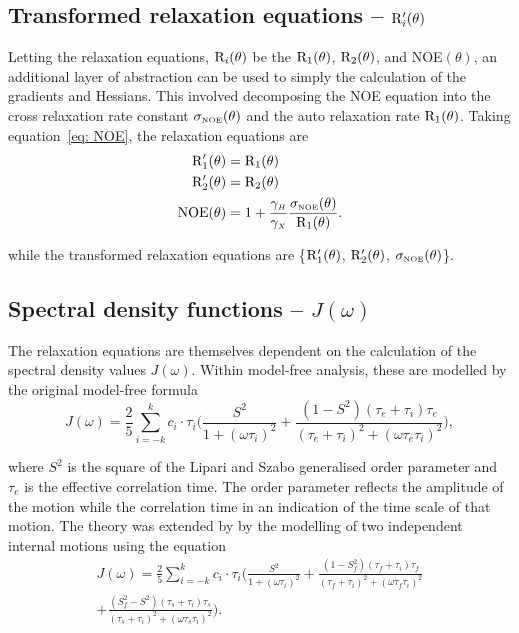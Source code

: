 \subsection{Transformed relaxation equations -- $\mathrm{R}_i'(\theta)$}

Letting the relaxation equations, $\mathrm{R}_i(\theta)$ be the $\mathrm{R}_1(\theta)$, $\mathrm{R}_2(\theta)$, and NOE$(\theta)$, an additional layer of abstraction can be used to simply the calculation of the gradients and Hessians.  This involved decomposing the NOE equation into the cross relaxation rate constant $\sigma_{\scriptscriptstyle \mathrm{NOE}}(\theta)$ and the auto relaxation rate $\mathrm{R}_1(\theta)$.  Taking equation~\eqref{eq: NOE}, the relaxation equations are
\begin{align}
 \mathrm{R}_1'(\theta) &= \mathrm{R}_1(\theta) \\
 \mathrm{R}_2'(\theta) &= \mathrm{R}_2(\theta) \\
 \mathrm{NOE}(\theta)  &= 1 + \frac{\gamma_{\scriptscriptstyle H}}{\gamma_{\scriptscriptstyle X}} \frac{\sigma_{\scriptscriptstyle \mathrm{NOE}}(\theta)}{\mathrm{R}_1(\theta)}.
\end{align}

\noindent while the transformed relaxation equations are \{$\mathrm{R}_1'(\theta)$, $\mathrm{R}_2'(\theta)$, $\sigma_{\scriptscriptstyle \mathrm{NOE}}(\theta)$\}.


\subsection{Spectral density functions -- $J(\omega)$}

The relaxation equations are themselves dependent on the calculation of the spectral density values $J(\omega)$.  Within model-free analysis, these are modelled by the original model-free formula \citep{LipariSzabo82a, LipariSzabo82b}
\begin{equation} \label{eq: J(w) model-free generic}
 J(\omega) = \frac{2}{5} \sum_{i=-k}^k c_i \cdot \tau_i \Bigg(
  \frac{S^2}{1 + (\omega \tau_i)^2}
  + \frac{(1 - S^2)(\tau_e + \tau_i)\tau_e}{(\tau_e + \tau_i)^2 + (\omega \tau_e \tau_i)^2}
 \Bigg),
\end{equation}

\noindent where $S^2$ is the square of the Lipari and Szabo generalised order parameter and $\tau_e$ is the effective correlation time.  The order parameter reflects the amplitude of the motion while the correlation time in an indication of the time scale of that motion.  The theory was extended by \citet{Clore90} by the modelling of two independent internal motions using the equation
\begin{multline} \label{eq: J(w) model-free ext generic}
 J(\omega) = \frac{2}{5} \sum_{i=-k}^k c_i \cdot \tau_i \Bigg(
  \frac{S^2}{1 + (\omega \tau_i)^2}
  + \frac{(1 - S^2_f)(\tau_f + \tau_i)\tau_f}{(\tau_f + \tau_i)^2 + (\omega \tau_f \tau_i)^2}       \\
  + \frac{(S^2_f - S^2)(\tau_s + \tau_i)\tau_s}{(\tau_s + \tau_i)^2 + (\omega \tau_s \tau_i)^2}
 \Bigg).
\end{multline}

